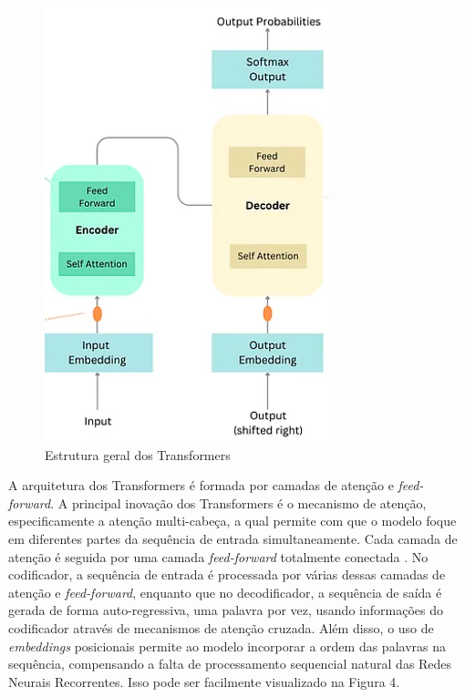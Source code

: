 \documentclass[conference]{IEEEtran}
\begin{document}
\begin{figure}[h!]
    \centering
    \includegraphics[width=\linewidth]{images/transformer.png}
    \caption{Estrutura geral dos Transformers}
    \label{fig:exemplo3}
\end{figure}

A arquitetura dos Transformers é formada por camadas de atenção e \textit{feed-forward}. A principal inovação dos Transformers é o mecanismo de atenção, especificamente a atenção multi-cabeça, a qual permite com que o modelo foque em diferentes partes da sequência de entrada simultaneamente. Cada camada de atenção é seguida por uma camada \textit{feed-forward} totalmente conectada \cite{trastru}. No codificador, a sequência de entrada é processada por várias dessas camadas de atenção e \textit{feed-forward}, enquanto que no decodificador, a sequência de saída é gerada de forma auto-regressiva, uma palavra por vez, usando informações do codificador através de mecanismos de atenção cruzada. Além disso, o uso de \textit{embeddings} posicionais permite ao modelo incorporar a ordem das palavras na sequência, compensando a falta de processamento sequencial natural das Redes Neurais Recorrentes\cite{tra}. Isso pode ser facilmente visualizado na Figura 4.
\end{document}
